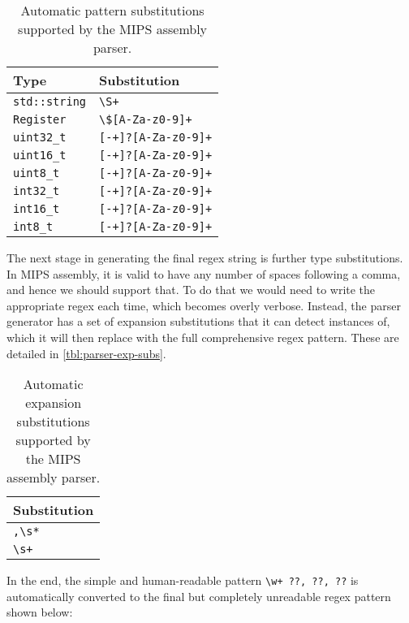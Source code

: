 \begin{table}[H] 
    \centering
    \begin{tabular}{l|l}
        \toprule
        Type & Substitution \\
        \midrule
        \texttt{std::string} & \texttt{\textbackslash S+} \\
        \texttt{Register} & \texttt{\textbackslash \$[A-Za-z0-9]+} \\
        \texttt{uint32\_t} & \texttt{[-+]?[A-Za-z0-9]+} \\
        \texttt{uint16\_t} & \texttt{[-+]?[A-Za-z0-9]+} \\
        \texttt{uint8\_t} & \texttt{[-+]?[A-Za-z0-9]+} \\
        \texttt{int32\_t} & \texttt{[-+]?[A-Za-z0-9]+} \\
        \texttt{int16\_t} & \texttt{[-+]?[A-Za-z0-9]+} \\
        \texttt{int8\_t} & \texttt{[-+]?[A-Za-z0-9]+} \\
        \bottomrule
    \end{tabular}
    \caption{Automatic pattern substitutions supported by the MIPS assembly parser.}
    \label{tbl:parser-type-subs}
\end{table}

The next stage in generating the final regex string is further type substitutions. In MIPS assembly, it is valid to have any number of spaces following a comma, and hence we should support that. To do that we would need to write the appropriate regex each time, which becomes overly verbose. Instead, the parser generator has a set of expansion substitutions that it can detect instances of, which it will then replace with the full comprehensive regex pattern. These are detailed in \autoref{tbl:parser-exp-subs}.

\begin{table}[H] 
    \centering
    \begin{tabular}{l}
        \toprule
        Substitution \\
        \midrule
        \texttt{,\textbackslash s*} \\
        \texttt{\textbackslash s+} \\
        \bottomrule
    \end{tabular}
    \caption{Automatic expansion substitutions supported by the MIPS assembly parser.}
    \label{tbl:parser-exp-subs}
\end{table}

In the end, the simple and human-readable pattern \texttt{\textbackslash w+ ??, ??, ??} is automatically converted to the final but completely unreadable regex pattern shown below:

